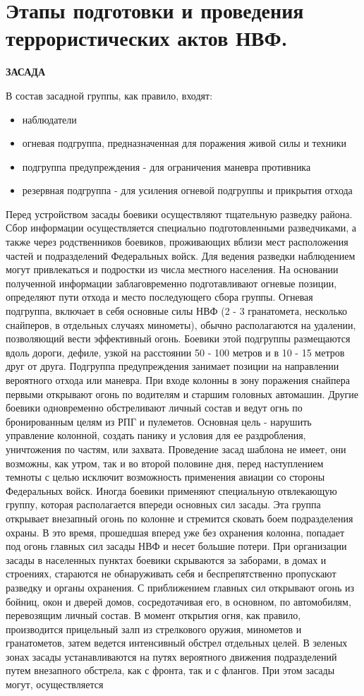 \documentclass[12pt,a4paper]{report}
\begin{document}
\section{Этапы подготовки и проведения террористических актов НВФ.}
\textbf{ЗАСАДА}

В состав засадной группы, как правило, входят: 
\begin{itemize}
	\item наблюдатели 
	\item огневая подгруппа, предназначенная для поражения живой силы и техники 
	\item подгруппа предупреждения - для ограничения маневра противника 
	\item резервная подгруппа - для усиления огневой подгруппы и прикрытия отхода 
\end{itemize}
Перед устройством засады боевики осуществляют тщательную разведку района. Сбор информации осуществляется специально подготовленными разведчиками, а также через родственников боевиков, проживающих вблизи мест расположения частей и подразделений Федеральных войск. Для ведения разведки наблюдением могут привлекаться и подростки из числа местного населения. На основании полученной информации заблаговременно подготавливают огневые позиции, определяют пути отхода и место последующего сбора группы. Огневая подгруппа, включает в себя основные силы НВФ (2 - 3 гранатомета, несколько снайперов, в отдельных случаях минометы), обычно располагаются на удалении, позволяющий вести эффективный огонь. Боевики этой подгруппы размещаются вдоль дороги, дефиле, узкой на расстоянии 50 - 100 метров и в 10 - 15 метров друг от друга. Подгруппа предупреждения занимает позиции на направлении вероятного отхода или маневра. При входе колонны в зону поражения снайпера первыми открывают огонь по водителям и старшим головных автомашин. Другие боевики одновременно обстреливают личный состав и ведут огнь по бронированным целям из РПГ и пулеметов. Основная цель - нарушить управление колонной, создать панику и условия для ее раздробления, уничтожения по частям, или захвата. Проведение засад шаблона не имеет, они возможны, как утром, так и во второй половине дня, перед наступлением темноты с целью исключит возможность применения авиации со стороны Федеральных войск. Иногда боевики применяют специальную отвлекающую группу, которая располагается впереди основных сил засады. Эта группа открывает внезапный огонь по колонне и стремится сковать боем подразделения охраны. В это время, прошедшая вперед уже без охранения колонна, попадает под огонь главных сил засады НВФ и несет большие потери. При организации засады в населенных пунктах боевики скрываются за заборами, в домах и строениях, стараются не обнаруживать себя и беспрепятственно пропускают разведку и органы охранения. С приближением главных сил открывают огонь из бойниц, окон и дверей домов, сосредотачивая его, в основном, по автомобилям, перевозящим личный состав. В момент открытия огня, как правило, производится прицельный залп из стрелкового оружия, минометов и гранатометов, затем ведется интенсивный обстрел отдельных целей. В зеленых зонах засады устанавливаются на путях вероятного движения подразделений путем внезапного обстрела, как с фронта, так и с флангов. При этом засады могут, осуществляется 
\end{document}
